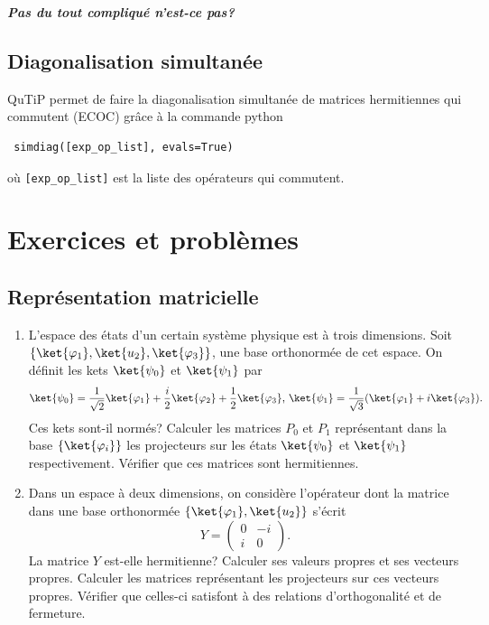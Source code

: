 \textbf{\emph{Pas du tout compliqué n'est-ce pas?}}

\subsection{Diagonalisation simultanée}

QuTiP permet de faire la diagonalisation simultanée de matrices hermitiennes 
qui commutent (ECOC) grâce à la commande python
\begin{lstlisting}
 simdiag([exp_op_list], evals=True)
\end{lstlisting}
où \texttt{[exp\_op\_list]} est la liste des opérateurs qui commutent.

\newpage


\section{Exercices et problèmes}

\subsection{Représentation matricielle}

\begin{enumerate}
\item L'espace des états d'un certain système physique est à trois dimensions.
Soit $\{\ket{\varphi_1}, \ket{u_{2}}, \ket{\varphi_3}\}$, une base
orthonormée de cet espace. On définit les kets $\ket{\psi_{0}}$ et
$\ket{\psi_1}$ par
\begin{equation}
\ket{\psi_{0}}=\frac{1}{\sqrt{2}}\ket{\varphi_1}+\frac{i}{2}\ket{\varphi_{2}}
+\frac{1}{2}\ket{\varphi_3} \text{, }\ket{\psi_1}=\frac{1}{\sqrt{3}}(
\ket{\varphi_1}+i\ket{\varphi_3}).
\end{equation}
Ces kets sont-il normés? Calculer les matrices $P_{0}$ et $P_1$ représentant
dans la base $\{\ket{\varphi_{i}}\}$ les projecteurs sur les états
$\ket{\psi_{0}}$ et $\ket{\psi_1}$ respectivement. Vérifier que ces matrices
sont hermitiennes.

\item Dans un espace à deux dimensions, on considère l'opérateur dont la
matrice dans une base orthonormée $\{\ket{\varphi_1},\ket{u_{2}}\}$ s'écrit
\begin{equation}
Y=\begin{pmatrix}
0 & -i\\
i & 0
\end{pmatrix}.
\end{equation}
La matrice $Y$ est-elle hermitienne? Calculer ses valeurs propres et ses
vecteurs propres. Calculer les matrices représentant les projecteurs sur ces
vecteurs propres. Vérifier que celles-ci satisfont à des relations
d'orthogonalité et de fermeture.

\end{enumerate}

